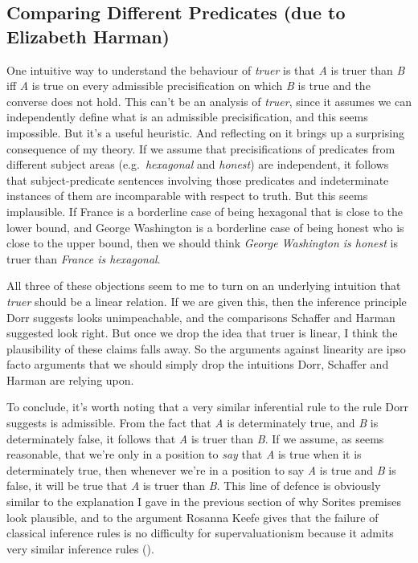\documentclass[
  11pt,
  letterpaper,
  DIV=11,
  numbers=noendperiod,
  twoside]{scrartcl}
\begin{document}
\subsection*{Comparing Different Predicates (due to Elizabeth
Harman)}\label{comparing-different-predicates-due-to-elizabeth-harman}

One intuitive way to understand the behaviour of \emph{truer} is that
\emph{A} is truer than \emph{B} iff \emph{A} is true on every admissible
precisification on which \emph{B} is true and the converse does not
hold. This can't be an analysis of \emph{truer}, since it assumes we can
independently define what is an admissible precisification, and this
seems impossible. But it's a useful heuristic. And reflecting on it
brings up a surprising consequence of my theory. If we assume that
precisifications of predicates from different subject areas
(e.g.~\emph{hexagonal} and \emph{honest}) are independent, it follows
that subject-predicate sentences involving those predicates and
indeterminate instances of them are incomparable with respect to truth.
But this seems implausible. If France is a borderline case of being
hexagonal that is close to the lower bound, and George Washington is a
borderline case of being honest who is close to the upper bound, then we
should think \emph{George Washington is honest} is truer than
\emph{France is hexagonal}.

All three of these objections seem to me to turn on an underlying
intuition that \emph{truer} should be a linear relation. If we are given
this, then the inference principle Dorr suggests looks unimpeachable,
and the comparisons Schaffer and Harman suggested look right. But once
we drop the idea that truer is linear, I think the plausibility of these
claims falls away. So the arguments against linearity are ipso facto
arguments that we should simply drop the intuitions Dorr, Schaffer and
Harman are relying upon.

To conclude, it's worth noting that a very similar inferential rule to
the rule Dorr suggests is admissible. From the fact that \emph{A} is
determinately true, and \emph{B} is determinately false, it follows that
\emph{A} is truer than \emph{B}. If we assume, as seems reasonable, that
we're only in a position to \emph{say} that \emph{A} is true when it is
determinately true, then whenever we're in a position to say \emph{A} is
true and \emph{B} is false, it will be true that \emph{A} is truer than
\emph{B}. This line of defence is obviously similar to the explanation I
gave in the previous section of why Sorites premises look plausible, and
to the argument Rosanna Keefe gives that the failure of classical
inference rules is no difficulty for supervaluationism because it admits
very similar inference rules ().
\end{document}
